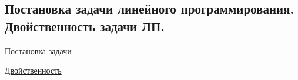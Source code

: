 \subsection{Постановка задачи линейного программирования. Двойственность задачи ЛП.}

\href{https://ru.wikipedia.org/wiki/%D0%9B%D0%B8%D0%BD%D0%B5%D0%B9%D0%BD%D0%BE%D0%B5_%D0%BF%D1%80%D0%BE%D0%B3%D1%80%D0%B0%D0%BC%D0%BC%D0%B8%D1%80%D0%BE%D0%B2%D0%B0%D0%BD%D0%B8%D0%B5}{Постановка задачи}

\href{https://ru.wikipedia.org/wiki/%D0%94%D0%B2%D0%BE%D0%B9%D1%81%D1%82%D0%B2%D0%B5%D0%BD%D0%BD%D0%B0%D1%8F_%D0%B7%D0%B0%D0%B4%D0%B0%D1%87%D0%B0_%D0%BB%D0%B8%D0%BD%D0%B5%D0%B9%D0%BD%D0%BE%D0%B3%D0%BE_%D0%BF%D1%80%D0%BE%D0%B3%D1%80%D0%B0%D0%BC%D0%BC%D0%B8%D1%80%D0%BE%D0%B2%D0%B0%D0%BD%D0%B8%D1%8F}{Двойственность}


